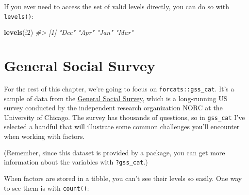 \documentclass[]{book}
\newenvironment{Shaded}{\begin{snugshade}}{\end{snugshade}}
\newcommand{\KeywordTok}[1]{\textcolor[rgb]{0.13,0.29,0.53}{\textbf{{#1}}}}
\newcommand{\CommentTok}[1]{\textcolor[rgb]{0.56,0.35,0.01}{\textit{{#1}}}}
\newcommand{\NormalTok}[1]{{#1}}
\begin{document}
If you ever need to access the set of valid levels directly, you can do
so with \texttt{levels()}:

\begin{Shaded}
\begin{Highlighting}[]
\KeywordTok{levels}\NormalTok{(f2)}
\CommentTok{#> [1] "Dec" "Apr" "Jan" "Mar"}
\end{Highlighting}
\end{Shaded}

\section{General Social Survey}\label{general-social-survey}

For the rest of this chapter, we're going to focus on
\texttt{forcats::gss\_cat}. It's a sample of data from the
\href{http://gss.norc.org}{General Social Survey}, which is a
long-running US survey conducted by the independent research
organization NORC at the University of Chicago. The survey has thousands
of questions, so in \texttt{gss\_cat} I've selected a handful that will
illustrate some common challenges you'll encounter when working with
factors.

\begin{Shaded}
\end{Shaded}

(Remember, since this dataset is provided by a package, you can get more
information about the variables with \texttt{?gss\_cat}.)

When factors are stored in a tibble, you can't see their levels so
easily. One way to see them is with \texttt{count()}:
\end{document}
